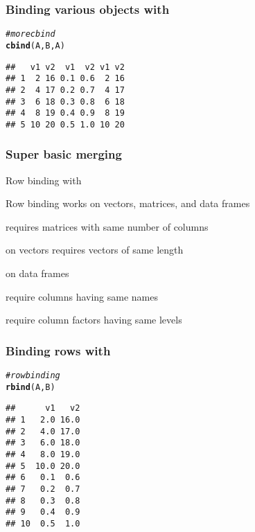 \documentclass[12pt]{beamer}\usepackage[]{graphicx}\usepackage[]{color}
\makeatletter
\newcommand{\hlcom}[1]{\textcolor[rgb]{0.678,0.584,0.686}{\textit{#1}}}%
\newcommand{\hlstd}[1]{\textcolor[rgb]{0.345,0.345,0.345}{#1}}%
\newcommand{\hlkwd}[1]{\textcolor[rgb]{0.737,0.353,0.396}{\textbf{#1}}}%
\newenvironment{kframe}{%
 \def\at@end@of@kframe{}%
 \ifinner\ifhmode%
  \def\at@end@of@kframe{\end{minipage}}%
  \begin{minipage}{\columnwidth}%
 \fi\fi%
 \def\FrameCommand##1{\hskip\@totalleftmargin \hskip-\fboxsep
 \colorbox{shadecolor}{##1}\hskip-\fboxsep
     \hskip-\linewidth \hskip-\@totalleftmargin \hskip\columnwidth}%
 \MakeFramed {\advance\hsize-\width
   \@totalleftmargin\z@ \linewidth\hsize
   \@setminipage}}%
 {\par\unskip\endMakeFramed%
 \at@end@of@kframe}
\newenvironment{knitrout}{}{} %
\makeatother
\begin{document}
\begin{frame}[fragile]
\frametitle{Binding various objects with }

\begin{knitrout}\footnotesize
{}\color{fgcolor}\begin{kframe}
\begin{alltt}
\hlcom{# more cbind}
\hlkwd{cbind}\hlstd{(A, B, A)}
\end{alltt}
\begin{verbatim}
##   v1 v2  v1  v2 v1 v2
## 1  2 16 0.1 0.6  2 16
## 2  4 17 0.2 0.7  4 17
## 3  6 18 0.3 0.8  6 18
## 4  8 19 0.4 0.9  8 19
## 5 10 20 0.5 1.0 10 20
\end{verbatim}
\end{kframe}
\end{knitrout}

\end{frame}


\begin{frame}[fragile]
\frametitle{Super basic merging}

\bi
  \item Row binding with 
  \item Row binding works on vectors, matrices, and data frames
  \item {} requires matrices with same number of columns
  \item {} on vectors requires vectors of same length
  \item {} on data frames
  \bi
    \item require columns having same names
    \item require column factors having same levels
  \ei
\ei

\end{frame}


\begin{frame}[fragile]
\frametitle{Binding rows with }

\begin{knitrout}\footnotesize
{}\color{fgcolor}\begin{kframe}
\begin{alltt}
\hlcom{# row binding}
\hlkwd{rbind}\hlstd{(A, B)}
\end{alltt}
\begin{verbatim}
##      v1   v2
## 1   2.0 16.0
## 2   4.0 17.0
## 3   6.0 18.0
## 4   8.0 19.0
## 5  10.0 20.0
## 6   0.1  0.6
## 7   0.2  0.7
## 8   0.3  0.8
## 9   0.4  0.9
## 10  0.5  1.0
\end{verbatim}
\end{kframe}
\end{knitrout}

\end{frame}
\end{document}
